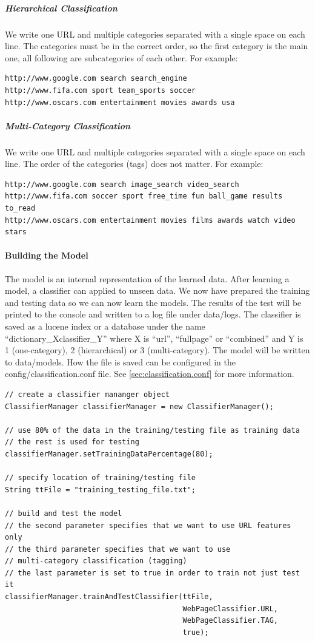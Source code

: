\documentclass[a4paper,twoside]{article}      %
\begin{document}
\subparagraph{Hierarchical Classification}
We write one URL and multiple categories separated with a single space on each line. The categories must be in the correct order, so the first category is the main one, all following are subcategories of each other. For example:
\begin{verbatim}
http://www.google.com search search_engine
http://www.fifa.com sport team_sports soccer 
http://www.oscars.com entertainment movies awards usa
\end{verbatim}

\subparagraph{Multi-Category Classification}
We write one URL and multiple categories separated with a single space on each line. The order of the categories (tags) does not matter. For example:
\begin{verbatim}
http://www.google.com search image_search video_search
http://www.fifa.com soccer sport free_time fun ball_game results to_read
http://www.oscars.com entertainment movies films awards watch video stars
\end{verbatim}

\paragraph{Building the Model}
The model is an internal representation of the learned data. After learning a model, a classifier can applied to unseen data. We now have prepared the training and testing data so we can now learn the models. The results of the test will be printed to the console and written to a log file under data/logs. The classifier is saved as a lucene index or a database under the name ``dictionary\_Xclassifier\_Y'' where X is ``url'', ``fullpage'' or ``combined'' and Y is 1 (one-category), 2 (hierarchical) or 3 (multi-category). The model will be written to data/models. How the file is saved can be configured in the config/classification.conf file. See \ref{sec:classification.conf} for more information.

\begin{codelisting}
\begin{lstlisting}[frame=tb]
// create a classifier mananger object
ClassifierManager classifierManager = new ClassifierManager();

// use 80% of the data in the training/testing file as training data
// the rest is used for testing
classifierManager.setTrainingDataPercentage(80);

// specify location of training/testing file
String ttFile = "training_testing_file.txt";

// build and test the model
// the second parameter specifies that we want to use URL features only
// the third parameter specifies that we want to use 
// multi-category classification (tagging)
// the last parameter is set to true in order to train not just test it
classifierManager.trainAndTestClassifier(ttFile,
                                         WebPageClassifier.URL, 
                                         WebPageClassifier.TAG,
                                         true);
\end{lstlisting}
\end{codelisting}
\end{document}
